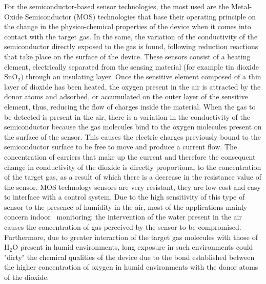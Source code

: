 \documentclass[10pt]{../imeko_acta}
\begin{document}
For the semiconductor-based sensor technologies, the most used are the Metal-Oxide Semiconductor (MOS) technologies that base their operating principle on the change in the physico-chemical properties of the device when it comes into contact with the target gas. In the same, the variation of the conductivity of the semiconductor directly exposed to the gas is found, following reduction reactions that take place on the surface of the device. These sensors consist of a heating element, electrically separated from the sensing material (for example tin dioxide $\mathrm{SnO_2}$) through an insulating layer. Once the sensitive element composed of a thin layer of dioxide has been heated, the oxygen present in the air is attracted by the donor atoms and adsorbed, or accumulated on the outer layer of the sensitive element, thus, reducing the flow of charges inside the material. When the gas to be detected is present in the air, there is a variation in the conductivity of the semiconductor because the gas molecules bind to the oxygen molecules present on the surface of the sensor. This causes the electric charges previously bound to the semiconductor surface to be free to move and produce a current flow. The concentration of carriers that make up the current and therefore the consequent change in conductivity of the dioxide is directly proportional to the concentration of the target gas, as a result of which there is a decrease in the resistance value of the sensor. MOS technology sensors are very resistant, they are low-cost and easy to interface with a control system. Due to the high sensitivity of this type of sensor to the presence of humidity in the air, most of the applications mainly concern indoor~\cite{PM25_5} monitoring: the intervention of the water present in the air causes the concentration of gas perceived by the sensor to be compromised. Furthermore, due to greater interaction of the target gas molecules with those of H$_2$O present in humid environments, long exposure in such environments could "dirty" the chemical qualities of the device due to the bond established between the higher concentration of oxygen in humid environments with the donor atoms of the dioxide.
\end{document}
